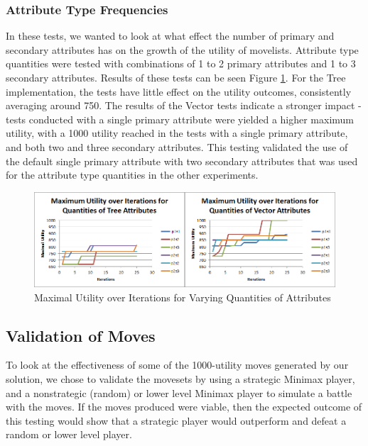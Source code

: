 \documentclass{acm_proc_article-sp}
\begin{document}
    \subsubsection{Attribute Type Frequencies}

In these tests, we wanted to look at what effect the number of primary and secondary attributes has on the growth of the utility of movelists. Attribute type quantities were tested with combinations of 1 to 2 primary attributes and 1 to 3 secondary attributes. Results of these tests can be seen Figure \ref{attribute_frequency_experiments}. For the Tree implementation, the tests have little effect on the utility outcomes, consistently averaging around 750. The results of the Vector tests indicate a stronger impact - tests conducted with a single primary attribute were yielded a higher maximum utility, with a 1000 utility reached in the tests with a single primary attribute, and both two and three secondary attributes. This testing validated the use of the default single primary attribute with two secondary attributes that was used for the attribute type quantities in the other experiments.

\begin{figure}[Ht]
    \centering
    \includegraphics[width=\textwidth,keepaspectratio]{./images/attr_frquency_comparison.png}
    \caption{Maximal Utility over Iterations for Varying Quantities of Attributes}
    \label{attribute_frequency_experiments}
\end{figure}
    
    \subsection{Validation of Moves}

To look at the effectiveness of some of the 1000-utility moves generated by our solution, we chose to validate the movesets by using a strategic Minimax player, and a nonstrategic (random) or lower level Minimax player to simulate a battle with the moves. If the moves produced were viable, then the expected outcome of this testing would show that a strategic player would outperform and defeat a random or lower level player.
\end{document}
